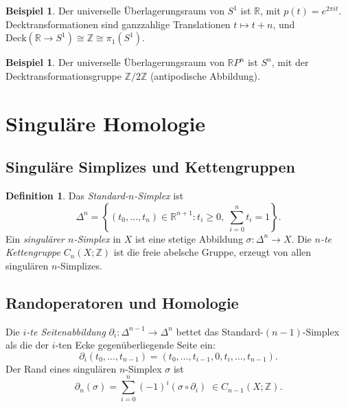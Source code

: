 \documentclass[12pt,a4paper]{amsart}
\theoremstyle{definition}
\newtheorem{definition}[theorem]{Definition}
\newtheorem{example}[theorem]{Beispiel}
\begin{document}
\begin{example}
Der universelle \"Uberlagerungsraum von $S^1$ ist $\mathbb{R}$, mit
$p(t) = e^{2\pi i t}$. Decktransformationen sind ganzzahlige Translationen
$t \mapsto t + n$, und $\mathrm{Deck}(\mathbb{R} \to S^1) \cong \mathbb{Z}
\cong \pi_1(S^1)$.
\end{example}

\begin{example}
Der universelle \"Uberlagerungsraum von $\mathbb{R}P^n$ ist $S^n$, mit
der Decktransformationsgruppe $\mathbb{Z}/2\mathbb{Z}$ (antipodische
Abbildung).
\end{example}

\section{Singul\"are Homologie}
\label{sec:homologie}

\subsection{Singul\"are Simplizes und Kettengruppen}

\begin{definition}
Das \emph{Standard-$n$-Simplex} ist
\[
  \Delta^n = \left\{ (t_0, \ldots, t_n) \in \mathbb{R}^{n+1}
    : t_i \geq 0,\; \sum_{i=0}^n t_i = 1 \right\}.
\]
Ein \emph{singul\"arer $n$-Simplex} in $X$ ist eine stetige Abbildung
$\sigma\colon \Delta^n \to X$. Die \emph{$n$-te Kettengruppe}
$C_n(X;\mathbb{Z})$ ist die freie abelsche Gruppe, erzeugt von allen
singul\"aren $n$-Simplizes.
\end{definition}

\subsection{Randoperatoren und Homologie}

Die \emph{$i$-te Seitenabbildung} $\partial_i\colon \Delta^{n-1} \to \Delta^n$
bettet das Standard-$(n-1)$-Simplex als die der $i$-ten Ecke gegen\"uberliegende
Seite ein:
\[
  \partial_i(t_0,\ldots,t_{n-1})
  = (t_0,\ldots,t_{i-1}, 0, t_i, \ldots, t_{n-1}).
\]
Der Rand eines singul\"aren $n$-Simplex $\sigma$ ist
\[
  \partial_n(\sigma) = \sum_{i=0}^n (-1)^i (\sigma \circ \partial_i)
  \;\in C_{n-1}(X;\mathbb{Z}).
\]
\end{document}
